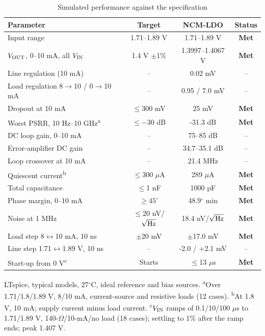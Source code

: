 \begin{table}[!t]
\centering
\caption{Simulated performance against the specification}
\label{tab:results}
\footnotesize
\setlength{\tabcolsep}{2pt}
\begin{tabular}{@{}lccc@{}}
\toprule
Parameter & Target & NCM-LDO & Status \\
\midrule
Input range & 1.71--1.89 V & 1.71--1.89 V & \textbf{Met} \\
$V_{\rm OUT}$, 0--10 mA, all $V_{\rm IN}$ & 1.4 V $\pm$1\% & 1.3997--1.4067 V & \textbf{Met} \\
Line regulation (10 mA) & -- & 0.02 mV & -- \\
Load regulation 8$\to$10 / 0$\to$10 mA & -- & 0.95 / 7.0 mV & -- \\
Dropout at 10 mA & $\le$300 mV & 25 mV & \textbf{Met} \\
Worst PSRR, 10 Hz--10 GHz\textsuperscript{a} & $\le-30$ dB & -31.3 dB & \textbf{Met} \\
DC loop gain, 0--10 mA & -- & 75--85 dB & -- \\
Error-amplifier DC gain & -- & 34.7--35.1 dB & -- \\
Loop crossover at 10 mA & -- & 21.4 MHz & -- \\
Quiescent current\textsuperscript{b} & $\le$300 $\mu$A & 289 $\mu$A & \textbf{Met} \\
Total capacitance & $\le$1 nF & 1000 pF & \textbf{Met} \\
Phase margin, 0--10 mA & $\ge45^\circ$ & 48.9$^\circ$ min & \textbf{Met} \\
Noise at 1 MHz & $\le$20 nV/$\sqrt{\rm Hz}$ & 18.4 nV/$\sqrt{\rm Hz}$ & \textbf{Met} \\
Load step 8$\leftrightarrow$10 mA, 10 ns & $\pm$20 mV & $\pm$17.0 mV & \textbf{Met} \\
Line step 1.71$\leftrightarrow$1.89 V, 10 ns & -- & -2.0 / +2.1 mV & -- \\
Start-up from 0 V\textsuperscript{c} & Starts & $\le$13 $\mu$s & \textbf{Met} \\
\bottomrule
\end{tabular}

\vspace{2pt}
\parbox{\columnwidth}{\scriptsize LTspice, typical models, 27$^\circ$C, ideal reference and bias sources.
\textsuperscript{a}Over 1.71/1.8/1.89 V, 8/10 mA, current-source and resistive loads (12 cases).
\textsuperscript{b}At 1.8 V, 10 mA; supply current minus load current.
\textsuperscript{c}$V_{\rm IN}$ ramps of 0.1/10/100 $\mu$s to 1.71/1.89 V, 140-$\Omega$/10-mA/no load (18 cases); settling to 1\% after the ramp ends; peak 1.407 V.}
\end{table}
